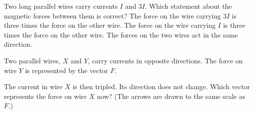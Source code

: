 \begin{quizq}{}
Two long parallel wires carry currents $I$ and $3I$. Which statement about the magnetic forces between
them is correct?
  {The force on the wire carrying $3I$ is three times the force on the other wire.}
  {The force on the wire carrying $I$ is three times the force on the other wire.}
  {The forces on the two wires act in the same direction.}
\end{quizq}

\begin{quizq}{}
Two parallel wires, $X$ and $Y$, carry currents in opposite directions. The force on wire $Y$ is
represented by the vector $F$.
\begin{center}
\end{center}
The current in wire $X$ is then tripled. Its direction does not change. Which vector represents the
force on wire $X$ now? (The arrows are drawn to the same scale as $F$.)
  {}
  {}
  {}
\end{quizq}
